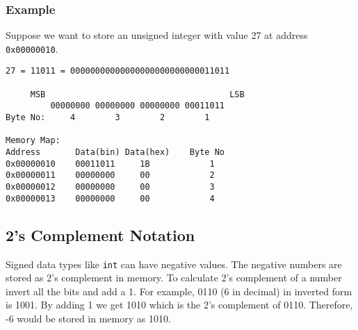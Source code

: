 \documentclass[12pt,a4paper]{article}
\begin{document}
\subsubsection{Example}
Suppose we want to store an unsigned integer with value 27 at address \verb|0x00000010|.

\begin{verbatim}
27 = 11011 = 00000000000000000000000000011011

     MSB                                     LSB
         00000000 00000000 00000000 00011011
Byte No:     4        3        2        1

Memory Map:
Address       Data(bin) Data(hex)    Byte No
0x00000010    00011011     1B            1
0x00000011    00000000     00            2
0x00000012    00000000     00            3
0x00000013    00000000     00            4
\end{verbatim}


\subsection{2's Complement Notation}
Signed data types like \verb|int| can have negative values. The negative numbers are stored as 2's complement in memory. To calculate 2's complement of a number invert all the bits and add a 1. For example, 0110 (6 in decimal) in inverted form is 1001. By adding 1 we get 1010 which is the 2's complement of 0110. Therefore, -6 would be stored in memory as 1010.
\end{document}

